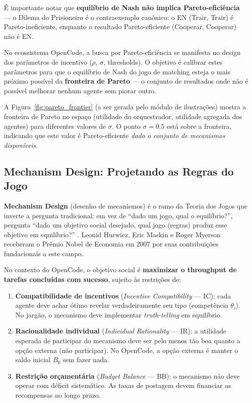 É importante notar que \textbf{equilíbrio de Nash não implica Pareto-eficiência} --- o Dilema do Prisioneiro é o contraexemplo canônico: o EN (Trair, Trair) é Pareto-ineficiente, enquanto o resultado Pareto-eficiente (Cooperar, Cooperar) não é EN.

No ecossistema OpenCode, a busca por Pareto-eficiência se manifesta no design dos parâmetros de incentivo ($\rho$, $\sigma$, thresholds). O objetivo é calibrar estes parâmetros para que o equilíbrio de Nash do jogo de matching esteja o mais próximo possível da \textbf{fronteira de Pareto} --- o conjunto de resultados onde não é possível melhorar nenhum agente sem piorar outro.

A Figura~\ref{fig:pareto_frontier} (a ser gerada pelo módulo de ilustrações) mostra a fronteira de Pareto no espaço (utilidade do orquestrador, utilidade agregada dos agentes) para diferentes valores de $\sigma$. O ponto $\sigma = 0.5$ está sobre a fronteira, indicando que este valor é Pareto-eficiente \textit{dado o conjunto de mecanismos disponíveis}.

\subsection{Mechanism Design: Projetando as Regras do Jogo}

\textbf{Mechanism Design} (desenho de mecanismos) é o ramo da Teoria dos Jogos que inverte a pergunta tradicional: em vez de ``dado um jogo, qual o equilíbrio?'', pergunta ``dado um objetivo social desejado, qual jogo (regras) produz esse objetivo em equilíbrio?'' \cite{myerson1981optimal, hurwicz1973resource}. Leonid Hurwicz, Eric Maskin e Roger Myerson receberam o Prêmio Nobel de Economia em 2007 por suas contribuições fundacionais a este campo.

No contexto do OpenCode, o objetivo social é \textbf{maximizar o throughput de tarefas concluídas com sucesso}, sujeito às restrições de:

\begin{enumerate}
    \item \textbf{Compatibilidade de incentivos} (\textit{Incentive Compatibility} --- IC): cada agente deve achar ótimo revelar verdadeiramente seu tipo (competência $\theta_i$). No jargão, o mecanismo deve implementar \textit{truth-telling} em equilíbrio.
    
    \item \textbf{Racionalidade individual} (\textit{Individual Rationality} --- IR): a utilidade esperada de participar do mecanismo deve ser pelo menos tão boa quanto a opção externa (não participar). No OpenCode, a opção externa é manter o saldo inicial $B_0$ sem fazer nada.
    
    \item \textbf{Restrição orçamentária} (\textit{Budget Balance} --- BB): o mecanismo não deve operar com déficit sistemático. As taxas de postagem devem financiar as recompensas no longo prazo.
\end{enumerate}

